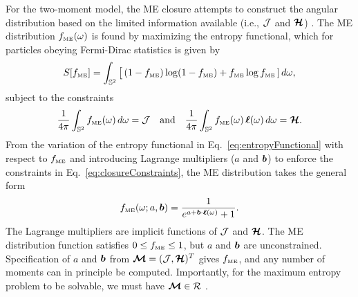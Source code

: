 For the two-moment model, the ME closure attempts to construct the angular distribution based on the limited information available (i.e., $\mathcal{J}$ and $\boldsymbol{\mathcal{H}}$) \cite{cernohorskyBludman_1994,lareckiBanach_2011}.  
The ME distribution $f_{\mbox{\tiny ME}}(\omega)$ is found by maximizing the entropy functional, which for particles obeying Fermi-Dirac statistics is given by
\begin{equation}
  S[f_{\mbox{\tiny ME}}] 
  = \int_{\mathbb{S}^{2}}\big[\,(1-f_{\mbox{\tiny ME}})\log(1-f_{\mbox{\tiny ME}}) + f_{\mbox{\tiny ME}}\log f_{\mbox{\tiny ME}}\,]\,d\omega,
  \label{eq:entropyFunctional}
\end{equation} 
subject to the constraints
\begin{equation}
  \frac{1}{4\pi}\int_{\mathbb{S}^{2}}f_{\mbox{\tiny ME}}(\omega)\,d\omega=\mathcal{J}
  \quad\text{and}\quad
  \frac{1}{4\pi}\int_{\mathbb{S}^{2}}f_{\mbox{\tiny ME}}(\omega)\,\boldsymbol{\ell}(\omega)\,d\omega=\boldsymbol{\mathcal{H}}.  
  \label{eq:closureConstraints}
\end{equation}
From the variation of the entropy functional in Eq.~\eqref{eq:entropyFunctional} with respect to $f_{\mbox{\tiny ME}}$ and introducing Lagrange multipliers ($a$ and $\boldsymbol{b}$) to enforce the constraints in Eq.~\eqref{eq:closureConstraints}, the ME distribution takes the general form \cite{cernohorskyBludman_1994}
\begin{equation}
  f_{\mbox{\tiny ME}}(\omega;a,\boldsymbol{b})=\frac{1}{e^{a + \boldsymbol{b}\cdot\boldsymbol{\ell}(\omega)}+1}.  
  \label{eq:fME}
\end{equation}
The Lagrange multipliers are implicit functions of $\mathcal{J}$ and $\boldsymbol{\mathcal{H}}$.  
The ME distribution function satisfies $0 \le f_{\mbox{\tiny ME}} \le 1$, but $a$ and $\boldsymbol{b}$ are unconstrained.  
Specification of $a$ and $\boldsymbol{b}$ from $\boldsymbol{\mathcal{M}}=(\mathcal{J},\boldsymbol{\mathcal{H}})^{T}$ gives $f_{\mbox{\tiny ME}}$, and any number of moments can in principle be computed.  
Importantly, for the maximum entropy problem to be solvable, we must have $\boldsymbol{\mathcal{M}}\in\mathcal{R}$ \cite{lareckiBanach_2011}.  

